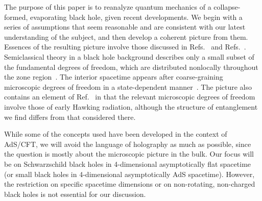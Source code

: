 \documentclass[12pt]{article}
\begin{document}
The purpose of this paper is to reanalyze quantum mechanics of a 
collapse-formed, evaporating black hole, given recent developments. 
We begin with a series of assumptions that seem reasonable and 
are consistent with our latest understanding of the subject, and 
then develop a coherent picture from them.  Essences of the resulting 
picture involve those discussed in Refs.~\cite{Nomura:2014woa,%
Nomura:2014voa,Nomura:2016qum} and Refs.~\cite{Papadodimas:2012aq,%
Papadodimas:2013jku,Papadodimas:2015jra}.  Semiclassical theory 
in a black hole background describes only a small subset of the 
fundamental degrees of freedom, which are distributed nonlocally 
throughout the zone region~\cite{Nomura:2014woa,Nomura:2014voa,%
Nomura:2016qum}.  The interior spacetime appears after 
coarse-graining microscopic degrees of freedom in a state-dependent 
manner~\cite{Papadodimas:2012aq,Papadodimas:2013jku,%
Papadodimas:2015jra}.  The picture also contains an element 
of Ref.~\cite{Maldacena:2013xja} in that the relevant microscopic 
degrees of freedom involve those of early Hawking radiation, 
although the structure of entanglement we find differs from 
that considered there.

While some of the concepts used have been developed in the context 
of AdS/CFT, we will avoid the language of holography as much as 
possible, since the question is mostly about the microscopic picture 
in the bulk.  Our focus will be on Schwarzschild black holes in 
4-dimensional asymptotically flat spacetime (or small black holes 
in 4-dimensional asymptotically AdS spacetime).  However, the 
restriction on specific spacetime dimensions or on non-rotating, 
non-charged black holes is not essential for our discussion.
\end{document}
